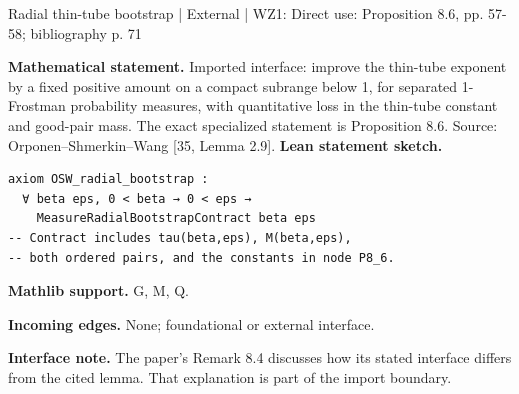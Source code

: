 \documentclass[10pt,a4paper]{article}
\begin{document}
\begin{minipage}{\linewidth}
\hypertarget{node-XOSW}{}
\begin{tcolorbox}[colback=white,colframe=externalfg,colbacktitle=externalbg,coltitle=ink,boxrule=0.45pt,arc=1.6mm,left=3mm,right=3mm,top=2mm,bottom=2mm,title={\sffamily\bfseries External [35, Lemma 2.9] \hfill \texttt{XOSW}}]
{\sffamily\small\color{muted}Radial thin-tube bootstrap | External | WZ1: Direct use: Proposition 8.6, pp. 57-58; bibliography p. 71}\par
\textbf{Mathematical statement.} Imported interface: improve the thin-tube exponent by a fixed positive amount on a compact subrange below 1, for separated 1-Frostman probability measures, with quantitative loss in the thin-tube constant and good-pair mass.
The exact specialized statement is Proposition 8.6. Source: Orponen--Shmerkin--Wang [35, Lemma 2.9].
\smallskip\textbf{Lean statement sketch.}
\begin{Verbatim}[fontsize=\small,breaklines=true,breakanywhere=true,tabsize=2]
axiom OSW_radial_bootstrap :
  ∀ beta eps, 0 < beta → 0 < eps →
    MeasureRadialBootstrapContract beta eps
-- Contract includes tau(beta,eps), M(beta,eps),
-- both ordered pairs, and the constants in node P8_6.
\end{Verbatim}
{\footnotesize\textbf{Mathlib support.} G, M, Q.\par
\textbf{Incoming edges.} None; foundational or external interface.\par}
{\footnotesize\textbf{Interface note.} The paper's Remark 8.4 discusses how its stated interface differs from the cited lemma. That explanation is part of the import boundary.}
\end{tcolorbox}\end{minipage}\par\medskip
\end{document}
